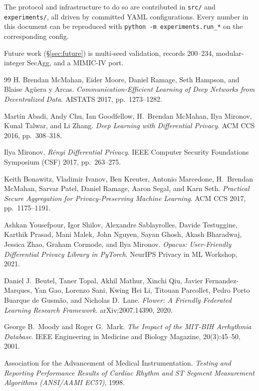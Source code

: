 \documentclass[11pt,a4paper]{report}
\begin{document}
The protocol and infrastructure to do so are contributed in \texttt{src/} and
\texttt{experiments/}, all driven by committed YAML configurations. Every
number in this document can be reproduced with \texttt{python -m
experiments.run\_*} on the corresponding config.

Future work (\S\ref{sec:future}) is multi-seed validation, records 200--234,
modular-integer SecAgg, and a MIMIC-IV port.

\begin{thebibliography}{99}
H. Brendan McMahan, Eider Moore, Daniel Ramage, Seth Hampson, and Blaise
Ag{\"u}era y Arcas.
\emph{Communication-Efficient Learning of Deep Networks from Decentralized
Data}.
AISTATS 2017, pp.\ 1273--1282.

Mart{\'i}n Abadi, Andy Chu, Ian Goodfellow, H.~Brendan McMahan, Ilya Mironov,
Kunal Talwar, and Li Zhang.
\emph{Deep Learning with Differential Privacy}.
ACM CCS 2016, pp.\ 308--318.

Ilya Mironov.
\emph{R{\'e}nyi Differential Privacy}.
IEEE Computer Security Foundations Symposium (CSF) 2017, pp.\ 263--275.

Keith Bonawitz, Vladimir Ivanov, Ben Kreuter, Antonio Marcedone, H.~Brendan
McMahan, Sarvar Patel, Daniel Ramage, Aaron Segal, and Karn Seth.
\emph{Practical Secure Aggregation for Privacy-Preserving Machine Learning}.
ACM CCS 2017, pp.\ 1175--1191.

Ashkan Yousefpour, Igor Shilov, Alexandre Sablayrolles, Davide Testuggine,
Karthik Prasad, Mani Malek, John Nguyen, Sayan Ghosh, Akash Bharadwaj, Jessica
Zhao, Graham Cormode, and Ilya Mironov.
\emph{Opacus: User-Friendly Differential Privacy Library in PyTorch}.
NeurIPS Privacy in ML Workshop, 2021.

Daniel J.\ Beutel, Taner Topal, Akhil Mathur, Xinchi Qiu, Javier Fernandez-Marques,
Yan Gao, Lorenzo Sani, Kwing Hei Li, Titouan Parcollet, Pedro Porto Buarque
de Gusm{\~a}o, and Nicholas D.\ Lane.
\emph{Flower: A Friendly Federated Learning Research Framework}.
arXiv:2007.14390, 2020.

George B.\ Moody and Roger G.\ Mark.
\emph{The Impact of the MIT-BIH Arrhythmia Database}.
IEEE Engineering in Medicine and Biology Magazine, 20(3):45--50, 2001.

Association for the Advancement of Medical Instrumentation.
\emph{Testing and Reporting Performance Results of Cardiac Rhythm and
ST Segment Measurement Algorithms (ANSI/AAMI EC57)}, 1998.


\end{thebibliography}
\end{document}
